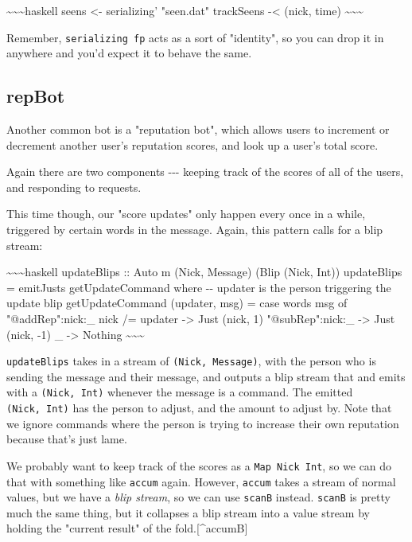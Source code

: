 \documentclass[]{article}
\begin{document}
\textasciitilde{}\textasciitilde{}\textasciitilde{}haskell seens \textless{}-
serializing' "seen.dat" trackSeens -\textless{} (nick, time)
\textasciitilde{}\textasciitilde{}\textasciitilde{}

Remember, \texttt{serializing\textquotesingle{}\ fp} acts as a sort of
"identity", so you can drop it in anywhere and you'd expect it to behave the
same.

\subsection{repBot}

Another common bot is a "reputation bot", which allows users to increment or
decrement another user's reputation scores, and look up a user's total score.

Again there are two components -\/-\/- keeping track of the scores of all of the
users, and responding to requests.

This time though, our "score updates" only happen every once in a while,
triggered by certain words in the message. Again, this pattern calls for a blip
stream:

\textasciitilde{}\textasciitilde{}\textasciitilde{}haskell updateBlips :: Auto m
(Nick, Message) (Blip (Nick, Int)) updateBlips = emitJusts getUpdateCommand
where -\/- updater is the person triggering the update blip getUpdateCommand
(updater, msg) = case words msg of "@addRep":nick:\_ \textbar{} nick /= updater
-\textgreater{} Just (nick, 1) "@subRep":nick:\_ -\textgreater{} Just (nick, -1)
\_ -\textgreater{} Nothing \textasciitilde{}\textasciitilde{}\textasciitilde{}

\texttt{updateBlips} takes in a stream of \texttt{(Nick,\ Message)}, with the
person who is sending the message and their message, and outputs a blip stream
that and emits with a \texttt{(Nick,\ Int)} whenever the message is a command.
The emitted \texttt{(Nick,\ Int)} has the person to adjust, and the amount to
adjust by. Note that we ignore commands where the person is trying to increase
their own reputation because that's just lame.

We probably want to keep track of the scores as a \texttt{Map\ Nick\ Int}, so we
can do that with something like \texttt{accum} again. However, \texttt{accum}
takes a stream of normal values, but we have a \emph{blip stream}, so we can use
\texttt{scanB} instead. \texttt{scanB} is pretty much the same thing, but it
collapses a blip stream into a value stream by holding the "current result" of
the fold.{[}\^{}accumB{]}
\end{document}
